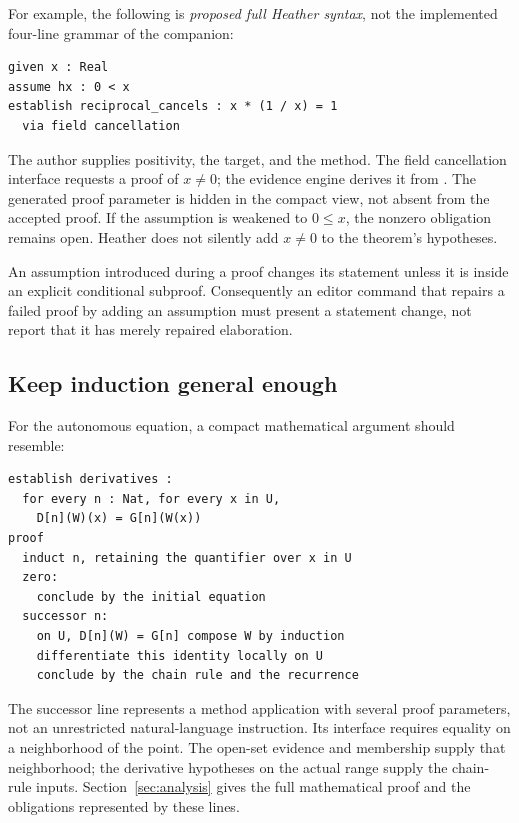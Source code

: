 \documentclass[11pt,letterpaper]{article}
\newcommand{\code}[1]{\texttt{\detokenize{#1}}}
\theoremstyle{definition}\newtheorem{definition}[theorem]{Definition}
\theoremstyle{remark}\newtheorem{remark}[theorem]{Remark}
\begin{document}
For example, the following is \emph{proposed full Heather syntax}, not the
implemented four-line grammar of the companion:
\par\noindent\begin{minipage}{\linewidth}
\begin{lstlisting}
given x : Real
assume hx : 0 < x
establish reciprocal_cancels : x * (1 / x) = 1
  via field cancellation
\end{lstlisting}
\end{minipage}\par
The author supplies positivity, the target, and the method. The field
cancellation interface requests a proof of $x\ne0$; the evidence engine derives
it from \code{hx}. The generated proof parameter is hidden in the compact view,
not absent from the accepted proof. If the assumption is weakened to $0\le x$,
the nonzero obligation remains open. Heather does not silently add $x\ne0$ to
the theorem's hypotheses.

An assumption introduced during a proof changes its statement unless it is
inside an explicit conditional subproof. Consequently an editor command that
repairs a failed proof by adding an assumption must present a statement change,
not report that it has merely repaired elaboration.

\subsection{Keep induction general enough}
For the autonomous equation, a compact mathematical argument should resemble:
\par\noindent\begin{minipage}{\linewidth}
\begin{lstlisting}
establish derivatives :
  for every n : Nat, for every x in U,
    D[n](W)(x) = G[n](W(x))
proof
  induct n, retaining the quantifier over x in U
  zero:
    conclude by the initial equation
  successor n:
    on U, D[n](W) = G[n] compose W by induction
    differentiate this identity locally on U
    conclude by the chain rule and the recurrence
\end{lstlisting}
\end{minipage}\par
The successor line represents a method application with several proof
parameters, not an unrestricted natural-language instruction. Its interface
requires equality on a neighborhood of the point. The open-set evidence and
membership supply that neighborhood; the derivative hypotheses on the actual
range supply the chain-rule inputs. Section~\ref{sec:analysis} gives the full
mathematical proof and the obligations represented by these lines.
\end{document}
